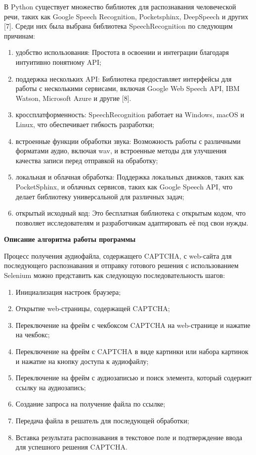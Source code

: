 В Python существует множество библиотек для распознавания человеческой речи, 
таких как Google Speech Recognition, Pocketsphinx, DeepSpeech и других [7]. 
Среди них была выбрана библиотека SpeechRecognition по следующим причинам:

\begin{enumerate}
    \item удобство использования: Простота в освоении и интеграции благодаря 
    интуитивно понятному API;
    \item поддержка нескольких API: Библиотека предоставляет интерфейсы для 
    работы с несколькими сервисами, включая Google Web Speech API, IBM Watson, 
    Microsoft Azure и другие [8].
    \item кроссплатформенность: SpeechRecognition работает на Windows, macOS и 
    Linux, что обеспечивает гибкость разработки;
    \item встроенные функции обработки звука: Возможность работы с различными 
    форматами аудио, включая wav, и встроенные методы для улучшения качества 
    записи перед отправкой на обработку;
    \item локальная и облачная обработка: Поддержка локальных движков, таких как 
    PocketSphinx, и облачных сервисов, таких как Google Speech API, что делает 
    библиотеку универсальной для различных задач;
    \item открытый исходный код: Это бесплатная библиотека с открытым кодом, что 
    позволяет исследователям и разработчикам адаптировать её под свои нужды.
\end{enumerate}

\textbf{Описание алгоритма работы программы}

Процесс получения аудиофайла, содержащего CAPTCHA, с web-сайта для последующего 
распознавания и отправку готового решения с использованием Selenium можно 
представить как следующую последовательность шагов:

\begin{enumerate}
    \item Инициализация настроек браузера;
    \item Открытие web-страницы, содержащей CAPTCHA;
    \item Переключение на фрейм с чекбоксом CAPTCHA на web-странице и нажатие на 
    чекбокс;
    \item Переключение на фрейм с CAPTCHA в виде картинки или набора картинок и 
    нажатие на кнопку доступа к аудиофайлу;
    \item Переключение на фрейм с аудиозаписью и поиск элемента, который содержит 
    ссылку на аудиозапись;
    \item Создание запроса на получение файла по ссылке;
    \item Передача файла в решатель для последующей обработки;
    \item Вставка результата распознавания в текстовое поле и подтверждение ввода 
    для успешного решения CAPTCHA.
\end{enumerate}

